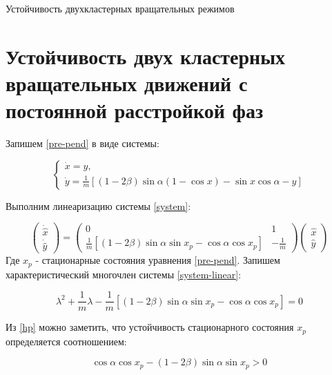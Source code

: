 \begin{chapter}{Устойчивость двухкластерных вращательных режимов}
	\section{Устойчивость двух кластерных вращательных движений с постоянной расстройкой фаз}
	
	Запишем \ref{pre-pend} в виде системы:
	
	\begin{equation} \label{system}
		\begin{cases}
			\dot{x} = y, \\
			\dot{y} = \frac{1}{m} \left[ (1 - 2\beta)\sin{\alpha}(1 - \cos{x}) - \sin{x}\cos{\alpha} - y \right]
		\end{cases}
	\end{equation}
	
	Выполним линеаризацию системы \ref{system}:
	
	\begin{equation} \label{system-linear}
		\begin{pmatrix}
			\dot{\hat{x}} \\
			\dot{\hat{y}}
		\end{pmatrix}
		=
		\begin{pmatrix}
			0 & 1 \\
			\frac{1}{m}\left[ (1 - 2\beta)\sin{\alpha}\sin{x_p} - \cos{\alpha}\cos{x_p} \right] & -\frac{1}{m}
		\end{pmatrix}
		\begin{pmatrix}
			\hat{x} \\
			\hat{y}
		\end{pmatrix}
	\end{equation}
	Где $x_p$ - стационарные состояния уравнения \ref{pre-pend}. Запишем характеристический многочлен системы \ref{system-linear}:
	
	\begin{equation} \label{hp}
		\lambda^2 + \frac{1}{m}\lambda - \frac{1}{m}\left[ (1 - 2\beta)\sin{\alpha}\sin{x_p} - \cos{\alpha}\cos{x_p} \right] = 0
	\end{equation}
	
	Из \ref{hp} можно заметить, что устойчивость стационарного состояния $x_p$ определяется соотношением:
	
	\begin{equation} \label{hp-stability}
		\cos{\alpha}\cos{x_p} - (1 - 2\beta)\sin{\alpha}\sin{x_p} > 0
	\end{equation}
	

\end{chapter}
